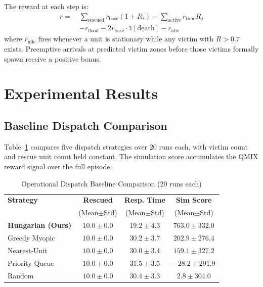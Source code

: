 \documentclass[conference]{IEEEtran}
\begin{document}
The reward at each step is:
\begin{equation}
\begin{split}
  r =\ &\sum_\text{rescued} r_\text{base}(1 + R_i)
      - \sum_\text{active} r_\text{time} R_j \\
      &- r_\text{flood} - 2r_\text{base}\cdot\mathbb{1}[\text{death}]
       - r_\text{idle}
\end{split}
  \label{eq:reward}
\end{equation}
where $r_\text{idle}$ fires whenever a unit is stationary while any victim
with $R > 0.7$ exists.
Preemptive arrivals at predicted victim zones before those victims formally
spawn receive a positive bonus.

\section{Experimental Results}
\label{sec:results}

\subsection{Baseline Dispatch Comparison}
\label{subsec:baselines}

Table~\ref{tab:baselines} compares five dispatch strategies over 20 runs each,
with victim count and rescue unit count held constant.
The simulation score accumulates the QMIX reward signal over the full episode.

\begin{table}[!t]
  \renewcommand{\arraystretch}{1.2}
  \caption{Operational Dispatch Baseline Comparison (20 runs each)}
  \label{tab:baselines}
  \centering
  \begin{tabular}{lccc}
    \toprule
    \textbf{Strategy} & \textbf{Rescued} & \textbf{Resp. Time} & \textbf{Sim Score} \\
                      & (Mean$\pm$Std)   & (Mean$\pm$Std)      & (Mean$\pm$Std)     \\
    \midrule
    \textbf{Hungarian (Ours)} & $10.0\pm0.0$ & $\mathbf{19.2\pm4.3}$ & $\mathbf{763.0\pm332.0}$ \\
    Greedy Myopic             & $10.0\pm0.0$ & $30.2\pm3.7$          & $202.9\pm276.4$          \\
    Nearest-Unit              & $10.0\pm0.0$ & $30.0\pm3.4$          & $159.1\pm327.2$          \\
    Priority Queue            & $10.0\pm0.0$ & $31.5\pm3.5$          & $-28.2\pm291.9$          \\
    Random                    & $10.0\pm0.0$ & $30.4\pm3.3$          & $2.8\pm304.0$            \\
    \bottomrule
  \end{tabular}
\end{table}
\end{document}
